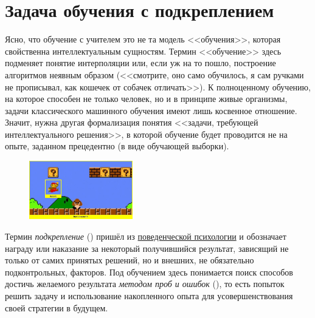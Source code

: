 \documentclass[../main.tex]{subfiles}
\begin{document}
\chapter{Задача обучения с подкреплением}

Ясно, что обучение с учителем это не та модель <<обучения>>, которая свойственна интеллектуальным сущностям. Термин <<обучение>> здесь подменяет понятие интерполяции или, если уж на то пошло, построение алгоритмов неявным образом (<<смотрите, оно само обучилось, я сам ручками не прописывал, как кошечек от собачек отличать>>). К полноценному обучению, на которое способен не только человек, но и в принципе живые организмы, задачи классического машинного обучения имеют лишь косвенное отношение. Значит, нужна другая формализация понятия <<задачи, требующей интеллектуального решения>>, в которой обучение будет проводится не на опыте, заданном прецедентно (в виде обучающей выборки).

\begin{figure}
\centering
\includegraphics[width=0.4\textwidth]{Images/agentenv.jpeg}
\end{figure}

Термин \emph{подкрепление} () пришёл из \href{https://ru.wikipedia.org/wiki/Бихевиоризм}{поведенческой психологии} и обозначает награду или наказание за некоторый получившийся результат, зависящий не только от самих принятых решений, но и внешних, не обязательно подконтрольных, факторов. Под обучением здесь понимается поиск способов достичь желаемого результата \emph{методом проб и ошибок} (), то есть попыток решить задачу и использование накопленного опыта для усовершенствования своей стратегии в будущем.
\end{document}
